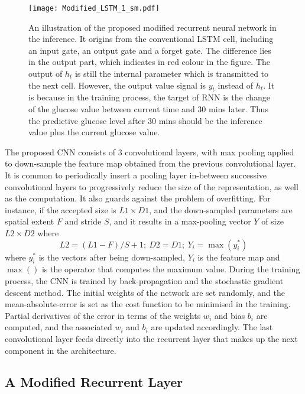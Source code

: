 \documentclass[a4paper, 10 pt, twocolumn]{IEEEtran}
\begin{document}
  \begin{figure*}[t]
  \texttt{[image: Modified\_LSTM\_1\_sm.pdf]} %
  \centering
  \caption{An illustration of the proposed modified recurrent neural network in the inference. It origins from the conventional LSTM cell, including an input gate, an output gate and a forget gate. The difference lies in
  the output part, which indicates in red colour in the figure. The output of $h_t$ is still the internal parameter which is transmitted to the next cell. However, the output value signal is $y_t$ instead of $h_t$. It is
  because in the training process, the target of RNN is the change of the glucose value between current time and 30 mins later. Thus the predictive glucose level after 30 mins should be the inference value plus the
  current glucose value.}\label{fig:lstm_chain}
  \centering
 \end{figure*}

The proposed CNN  consists of 3 convolutional layers, with max pooling applied to down-sample the feature map obtained from the previous convolutional layer. It is common to periodically insert a pooling layer in-between
successive convolutional layers to progressively {reduce the size of the representation, as well as the computation}. It also guards against the problem of overfitting. For instance, if the accepted size is $L1 \times
D1$, and the down-sampled parameters are spatial extent $F$ and stride $S$, and it results in a max-pooling vector $Y$ of size $L2 \times D2$ where
\begin{equation}\label{eq:LD}
L2 = (L1-F)/S + 1; \ D2 = D1;  \ Y_i = \max(y_i^*)
\end{equation}
where $y_i^*$ is the vectors after being down-sampled, $Y_i$ is the feature map and $\max()$ is the operator that computes the maximum value.  During the training process, the CNN is trained by back-propagation and the
stochastic gradient descent method. The initial weights of the network are set randomly, and the mean-absolute-error is set as the cost function to be minimised in the training. Partial derivatives of the error in terms
of the weights $w_i$ and bias $b_i$ are computed, and the associated $w_i$ and $b_i$ are updated accordingly. The last convolutional layer feeds directly into the recurrent layer that makes up the next component in the
architecture.



\subsection{A Modified Recurrent Layer}
\end{document}

